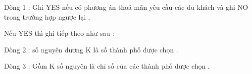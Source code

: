 Dòng 1 : Ghi YES nếu có phương án thoả mãn yêu cầu các du khách và ghi NO trong trường hợp ngược lại .   


   Nếu YES thì ghi tiếp theo như sau :   


   Dòng 2 : số nguyên dương K là số thành phố được chọn .   


   Dòng 3 : Gồm K số nguyên là chỉ số của các thành phố được chọn .
